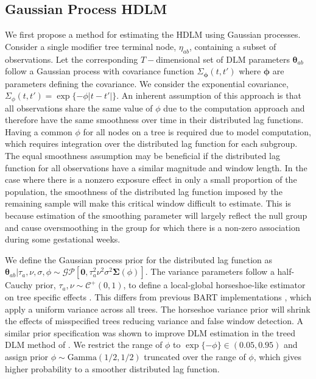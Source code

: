 \documentclass[12pt]{article}
\begin{document}
\subsection{Gaussian Process HDLM}
We first propose a method for estimating the HDLM using Gaussian processes. Consider a single modifier tree terminal node, $\eta_{ab}$, containing a subset of observations. Let the corresponding $T-$dimensional set of DLM parameters $\boldsymbol\theta_{ab}$ follow a Gaussian process with covariance function $\Sigma_{\boldsymbol\phi}(t,t')$ where $\boldsymbol\phi$ are parameters defining the covariance. We consider the exponential covariance, $\Sigma_{\phi}(t,t')=\exp\{-\phi|t-t'|\}$. An inherent assumption of this approach is that all observations share the same value of $\phi$ due to the computation approach and therefore have the same smoothness over time in their distributed lag functions. Having a common $\phi$ for all nodes on a tree is required due to model computation, which requires integration over the distributed lag function for each subgroup. The equal smoothness assumption may be beneficial if the distributed lag function for all observations have a similar magnitude and window length. In the case where there is a nonzero exposure effect in only a small proportion of the population, the smoothness of the distributed lag function imposed by the remaining sample will make this critical window difficult to estimate. This is because estimation of the smoothing parameter will largely reflect the null group and cause oversmoothing in the group for which there is a non-zero association during some gestational weeks.

We define the Gaussian process prior for the distributed lag function as $\boldsymbol\theta_{ab} |\tau_a,\nu,\sigma,\phi \sim \mathcal{GP}[\mathbf{0},\tau_a^2\nu^2\sigma^2\boldsymbol\Sigma(\phi)]$.
The variance parameters follow a half-Cauchy prior, $\tau_a,\nu\sim\mathcal{C}^+(0,1)$, to define a local-global horseshoe-like estimator on tree specific effects \citep{Carvalho2010}. This differs from previous BART implementations \citep{Chipman2012,Starling2019}, which apply a uniform variance across all trees. The horseshoe variance prior will shrink the effects of misspecified trees reducing variance and false window detection. A similar prior specification was shown to improve DLM estimation in the treed DLM method of \cite{Mork2023EstimatingPairs}. We restrict the range of $\phi$ to $\exp\{-\phi\}\in(0.05, 0.95)$ and assign prior $\phi\sim\text{Gamma}(1/2,1/2)$ truncated over the range of $\phi$, which gives higher probability to a smoother distributed lag function.
\end{document}

